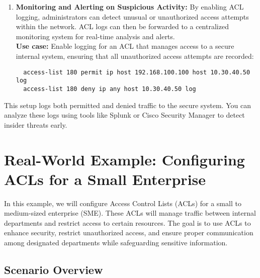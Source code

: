 \documentclass[11pt,a4paper]{article}
\begin{document}
\begin{enumerate}
            \item \textbf{Monitoring and Alerting on Suspicious Activity:} By enabling ACL logging, administrators can detect unusual or unauthorized access attempts within the network. ACL logs can then be forwarded to a centralized monitoring system for real-time analysis and alerts.
            \\[1em]
            \textbf{Use case:} Enable logging for an ACL that manages access to a secure internal system, ensuring that all unauthorized access attempts are recorded:

\begin{lstlisting}
  access-list 180 permit ip host 192.168.100.100 host 10.30.40.50 log
  access-list 180 deny ip any host 10.30.40.50 log                             
\end{lstlisting}
        \end{enumerate}

            This setup logs both permitted and denied traffic to the secure system. You can analyze these logs using tools like Splunk or Cisco Security Manager to detect insider threats early.

\section*{Real-World Example: Configuring ACLs for a Small Enterprise}
In this example, we will configure Access Control Lists (ACLs) for a small to medium-sized enterprise (SME). These ACLs will manage traffic between internal departments and restrict access to certain resources. The goal is to use ACLs to enhance security, restrict unauthorized access, and ensure proper communication among designated departments while safeguarding sensitive information.

    \subsection*{Scenario Overview}
\end{document}
